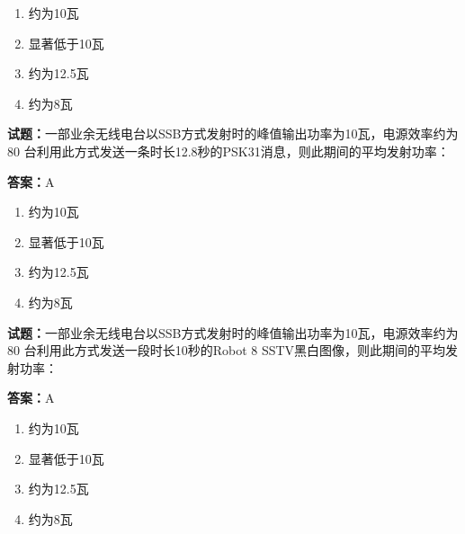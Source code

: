 \documentclass{ctexbook}
\begin{document}
\begin{enumerate}[leftmargin=3em]
  \item 约为10瓦 

  \item 显著低于10瓦 

  \item 约为12.5瓦 

  \item 约为8瓦 

\end{enumerate}





\vspace{1em}

\textbf{试题：}一部业余无线电台以SSB方式发射时的峰值输出功率为10瓦，电源效率约为80%
台利用此方式发送一条时长12.8秒的PSK31消息，则此期间的平均发射功率： 

\textbf{答案：}A 

\begin{enumerate}[leftmargin=3em]
  \item 约为10瓦 

  \item 显著低于10瓦 

  \item 约为12.5瓦 

  \item 约为8瓦 

\end{enumerate}






\vspace{1em}

\textbf{试题：}一部业余无线电台以SSB方式发射时的峰值输出功率为10瓦，电源效率约为80%
台利用此方式发送一段时长10秒的Robot 8 SSTV黑白图像，则此期间的平均发射功率： 

\textbf{答案：}A 

\begin{enumerate}[leftmargin=3em]
  \item 约为10瓦 

  \item 显著低于10瓦 

  \item 约为12.5瓦 

  \item 约为8瓦 

\end{enumerate}
\end{document}
